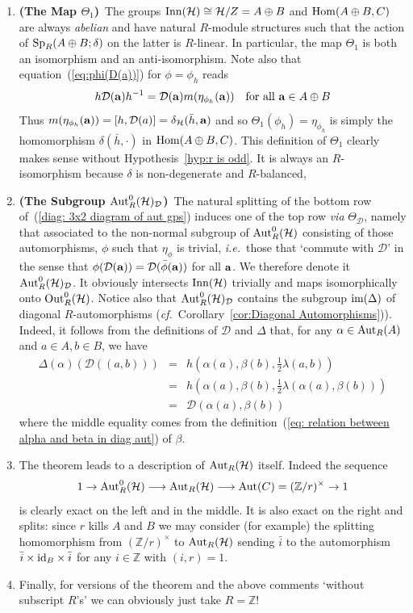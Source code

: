 \documentclass[12pt]{article}
\newcounter{example}[section]
\newcommand{\addwords}[1]{\ \ \ \mbox{#1}}
\newcommand{\Aut}{{\rm Aut}}
\newcommand{\ba}{\ensuremath{{\bf a}}}
\newcommand{\bbZ}{\ensuremath{\mathbb{Z}}}
\newcommand{\cD}{\ensuremath{\mathcal{D}}}
\newcommand{\cf}{\emph{cf.}}
\newcommand{\cH}{\ensuremath{\mathcal{H}}}
\newcommand{\Hom}{{\rm Hom}}
\newcommand{\id}{{\rm id}}
\newcommand{\ie}{{\em i.e.}}
\newcommand{\im}{{\rm im}}
\newcommand{\Inn}{{\rm Inn}}
\newcommand{\inv}{^{-1}}%
\newcommand{\Out}{{\rm Out}}
\newcommand{\ses}[5]{#1\rightarrow #2\longrightarrow #3\longrightarrow 
#4\rightarrow #5}
\newcommand{\Zover}[1]{\ensuremath{\bbZ/#1}}
\newcommand{\AdsB}{\ensuremath{A\oplus B}}
\newcommand{\SpABd}[1]{\ensuremath{{\rm Sp}_{#1}(\AdsB;\delta)}}
\begin{document}
\begin{enumerate}
\item\label{part: Comments1}{\bf (The Map $\Theta_1$)}\ The groups $\Inn(\cH)\cong\cH/Z=\AdsB$ and $\Hom(\AdsB,C)$ are always \textit{abelian} and have natural $R$-module structures such that the action of $\SpABd{R}$ on the latter is $R$-linear. In particular, the map $\Theta_1$ is both an isomorphism and an anti-isomorphism. 
Note also that  equation~(\ref{eq:phi(D(a))}) for $\phi=\phi_h$ reads
$$
h\cD(\ba)h\inv=\cD(\ba)m(\eta_{\phi_h}(\ba))
\addwords{for all $\ba\in \AdsB$}
$$ 
Thus 
$
m(\eta_{\phi_h}(\ba))=[h,\cD(a)]=\delta_\cH(\bar{h},\ba)
$
and so  $\Theta_1(\phi_h)=\eta_{\phi_h}$ is simply the homomorphism $\delta(\bar{h},\cdot)$ in $\Hom(\AdsB,C)$. This definition of $\Theta_1$ clearly makes sense without Hypothesis~\ref{hyp:r is odd}. It is always an $R$-isomorphism because $\delta$ is non-degenerate and $R$-balanced, 
\item\label{part: Comments2} {\bf (The Subgroup $\Aut_R^0(\cH)_\cD$)}\ 
The natural splitting of the bottom row of~(\ref{diag: 3x2 diagram of aut gps}) induces one of the top row \textit{via} $\Theta_\cD$, namely that associated to  the non-normal subgroup of $\Aut^0_R(\cH)$ consisting of those automorphisms, $\phi$ such that $\eta_\phi$ is trivial, \ie\ those that `commute with $\cD$' in the sense that  $\phi(\cD(\ba))=\cD(\bar{\phi}(\ba))$ for all $\ba$. We therefore denote it $\Aut_R^0(\cH)_\cD$. It obviously intersects $\Inn(\cH)$ trivially and maps isomorphically onto $\Out_R^0(\cH)$.  Notice also that $\Aut_R^0(\cH)_\cD$ contains the subgroup $\im(\Delta)$ of diagonal $R$-automorphisms  (\cf\ Corollary~\ref{cor:Diagonal Automorphisms})). Indeed, it follows from the definitions of $\cD$ and  $\Delta$ that,
for any $\alpha\in\Aut_R(A)$ and  $a\in A, b\in B$, we have 
\begin{eqnarray}
	\Delta(\alpha)(\cD((a,b)))
	&=&h\left(\alpha(a),\beta(b),\frac12 \lambda(a,b)\right)\nonumber\\
	&=&h\left(\alpha(a),\beta(b),\frac12 \lambda(\alpha(a),\beta(b))\right)\nonumber\\
	&=&
	\cD(\alpha(a),\beta(b))\label{eq:D commutes w diag autoorphisms}
\end{eqnarray}
where the middle equality comes from the definition~(\ref{eq: relation between alpha and beta in diag aut}) of $\beta$.
\item\label{part: Comments3} 
The theorem leads to a description of $\Aut_R(\cH)$ itself. Indeed the sequence 
$$
\ses{1}{\Aut_R^0(\cH)}{\Aut_R(\cH)}{\Aut(C)=(\Zover{r})^\times}{1}
$$
is clearly exact on the left and in the middle. It is also exact on the right and splits: since $r$ kills $A$ and $B$ we may consider (for example) the splitting homomorphism from $(\Zover{r})^\times$ to $\Aut_R(\cH)$ sending $\bar i$ to the automorphism $\bar i \times \id_B \times \bar i$ for any $i\in\bbZ$ with $(i,r)=1$. 
\item\label{part: Comments4}
Finally, for versions of the theorem and the above comments `without subscript $R$'s' we can obviously just take $R=\bbZ$! 
\end{enumerate}
\end{document}
